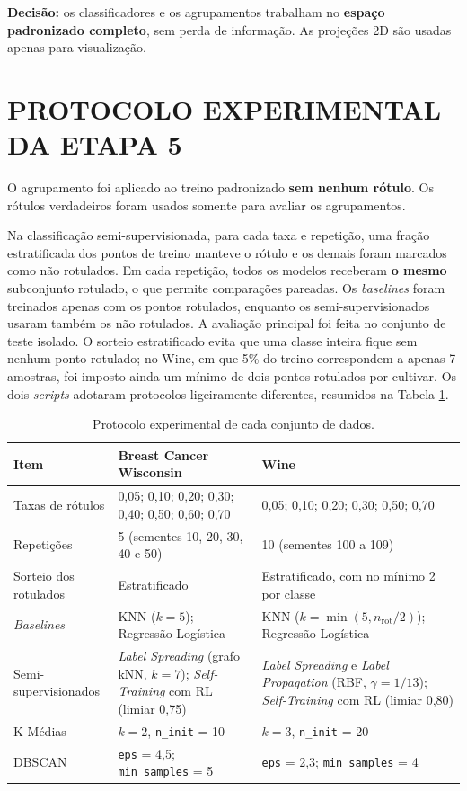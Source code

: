 \textbf{Decisão:} os classificadores e os agrupamentos trabalham no \textbf{espaço padronizado completo}, sem perda de informação. As projeções 2D são usadas apenas para visualização.

\section{PROTOCOLO EXPERIMENTAL DA ETAPA 5}

O agrupamento foi aplicado ao treino padronizado \textbf{sem nenhum rótulo}. Os rótulos verdadeiros foram usados somente para avaliar os agrupamentos.

Na classificação semi-supervisionada, para cada taxa e repetição, uma fração estratificada dos pontos de treino manteve o rótulo e os demais foram marcados como não rotulados. Em cada repetição, todos os modelos receberam \textbf{o mesmo} subconjunto rotulado, o que permite comparações pareadas. Os \textit{baselines} foram treinados apenas com os pontos rotulados, enquanto os semi-supervisionados usaram também os não rotulados. A avaliação principal foi feita no conjunto de teste isolado. O sorteio estratificado evita que uma classe inteira fique sem nenhum ponto rotulado; no Wine, em que 5\% do treino correspondem a apenas 7 amostras, foi imposto ainda um mínimo de dois pontos rotulados por cultivar. Os dois \textit{scripts} adotaram protocolos ligeiramente diferentes, resumidos na Tabela \ref{tab:protocolo}.

\begin{table}[htbp]
\centering
\caption{Protocolo experimental de cada conjunto de dados.}
\label{tab:protocolo}
\footnotesize
\begin{tabular}{p{3.0cm} p{5.6cm} p{5.6cm}}
\toprule
\textbf{Item} & \textbf{Breast Cancer Wisconsin} & \textbf{Wine} \\
\midrule
Taxas de rótulos & 0,05; 0,10; 0,20; 0,30; 0,40; 0,50; 0,60; 0,70 & 0,05; 0,10; 0,20; 0,30; 0,50; 0,70 \\
\addlinespace
Repetições & 5 (sementes 10, 20, 30, 40 e 50) & 10 (sementes 100 a 109) \\
\addlinespace
Sorteio dos rotulados & Estratificado & Estratificado, com no mínimo 2 por classe \\
\addlinespace
\textit{Baselines} & KNN ($k = 5$); Regressão Logística & KNN ($k = \min(5, n_{\text{rot}}/2)$); Regressão Logística \\
\addlinespace
Semi-supervisionados & \textit{Label Spreading} (grafo kNN, $k = 7$); \textit{Self-Training} com RL (limiar 0,75) & \textit{Label Spreading} e \textit{Label Propagation} (RBF, $\gamma = 1/13$); \textit{Self-Training} com RL (limiar 0,80) \\
\addlinespace
K-Médias & $k = 2$, \texttt{n\_init} = 10 & $k = 3$, \texttt{n\_init} = 20 \\
\addlinespace
DBSCAN & \texttt{eps} = 4,5; \texttt{min\_samples} = 5 & \texttt{eps} = 2,3; \texttt{min\_samples} = 4 \\
\bottomrule
\end{tabular}
\end{table}
